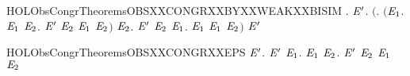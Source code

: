 \begin{SaveVerbatim}{HOLObsCongrTheoremsOBSXXCONGRXXBYXXWEAKXXBISIM}
\HOLTokenTurnstile{} \HOLSymConst{\HOLTokenForall{}}.
         \HOLSymConst{\HOLTokenImp{}}
       \HOLSymConst{\HOLTokenForall{}} \ensuremath{\HOLBoundVar{E}\sp{\prime}}.
           \ensuremath{(}\HOLSymConst{\HOLTokenForall{}}.
                \ensuremath{(}\HOLSymConst{\HOLTokenForall{}}\ensuremath{\HOLBoundVar{E}\sb{\mathrm{1}}}.  \HOLTokenTransBegin{}\HOLTokenTransEnd \ensuremath{\HOLBoundVar{E}\sb{\mathrm{1}}} \HOLSymConst{\HOLTokenImp{}} \HOLSymConst{\HOLTokenExists{}}\ensuremath{\HOLBoundVar{E}\sb{\mathrm{2}}}. \ensuremath{\HOLBoundVar{E}\sp{\prime}} \HOLTokenWeakTransBegin{}\HOLTokenWeakTransEnd \ensuremath{\HOLBoundVar{E}\sb{\mathrm{2}}} \HOLSymConst{\HOLTokenConj{}}  \ensuremath{\HOLBoundVar{E}\sb{\mathrm{1}}} \ensuremath{\HOLBoundVar{E}\sb{\mathrm{2}}}\ensuremath{)} \HOLSymConst{\HOLTokenConj{}}
                \HOLSymConst{\HOLTokenForall{}}\ensuremath{\HOLBoundVar{E}\sb{\mathrm{2}}}. \ensuremath{\HOLBoundVar{E}\sp{\prime}} \HOLTokenTransBegin{}\HOLTokenTransEnd \ensuremath{\HOLBoundVar{E}\sb{\mathrm{2}}} \HOLSymConst{\HOLTokenImp{}} \HOLSymConst{\HOLTokenExists{}}\ensuremath{\HOLBoundVar{E}\sb{\mathrm{1}}}.  \HOLTokenWeakTransBegin{}\HOLTokenWeakTransEnd \ensuremath{\HOLBoundVar{E}\sb{\mathrm{1}}} \HOLSymConst{\HOLTokenConj{}}  \ensuremath{\HOLBoundVar{E}\sb{\mathrm{1}}} \ensuremath{\HOLBoundVar{E}\sb{\mathrm{2}}}\ensuremath{)} \HOLSymConst{\HOLTokenImp{}}
             \ensuremath{\HOLBoundVar{E}\sp{\prime}}
\end{SaveVerbatim}
\newcommand{\HOLObsCongrTheoremsOBSXXCONGRXXBYXXWEAKXXBISIM}{\UseVerbatim{HOLObsCongrTheoremsOBSXXCONGRXXBYXXWEAKXXBISIM}}
\begin{SaveVerbatim}{HOLObsCongrTheoremsOBSXXCONGRXXEPS}
\HOLTokenTurnstile{} \HOLSymConst{\HOLTokenForall{}} \ensuremath{\HOLBoundVar{E}\sp{\prime}}.
         \ensuremath{\HOLBoundVar{E}\sp{\prime}} \HOLSymConst{\HOLTokenImp{}}
       \HOLSymConst{\HOLTokenForall{}}\ensuremath{\HOLBoundVar{E}\sb{\mathrm{1}}}.   \ensuremath{\HOLBoundVar{E}\sb{\mathrm{1}}} \HOLSymConst{\HOLTokenImp{}} \HOLSymConst{\HOLTokenExists{}}\ensuremath{\HOLBoundVar{E}\sb{\mathrm{2}}}.  \ensuremath{\HOLBoundVar{E}\sp{\prime}} \ensuremath{\HOLBoundVar{E}\sb{\mathrm{2}}} \HOLSymConst{\HOLTokenConj{}}  \ensuremath{\HOLBoundVar{E}\sb{\mathrm{1}}} \ensuremath{\HOLBoundVar{E}\sb{\mathrm{2}}}
\end{SaveVerbatim}

